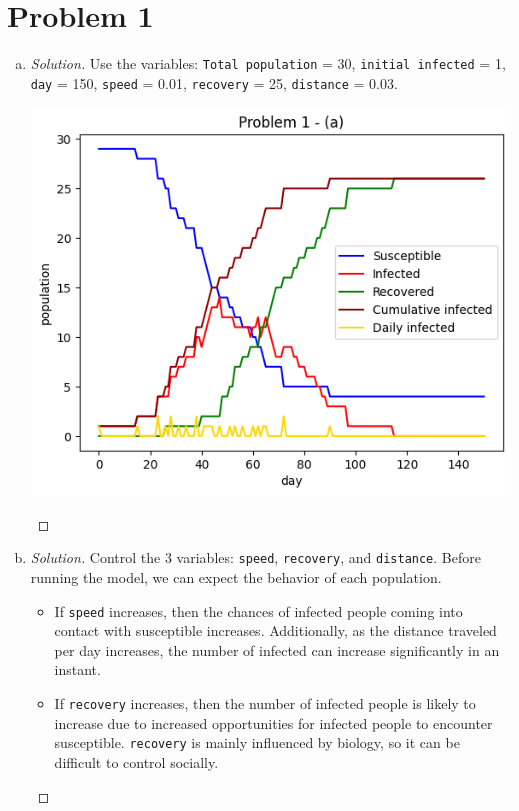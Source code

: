 \section*{Problem 1}
	\begin{enumerate} [a)]
		\item 
		\begin{proof} [Solution]
			Use the variables: \texttt{Total population} = 30, \texttt{initial infected} = 1, \texttt{day} = 150, \texttt{speed} = 0.01, \texttt{recovery} = 25, \texttt{distance} = 0.03.
			\begin{center}
				\includegraphics[scale=0.7]{Problem1_a.png}
			\end{center}
		\end{proof}
		\item 
		\begin{proof} [Solution]
			Control the 3 variables: \texttt{speed}, \texttt{recovery}, and \texttt{distance}. Before running the model, we can expect the behavior of each population.
			\begin{itemize}
				\item If \texttt{speed} increases, then the chances of infected people coming into contact with susceptible increases. Additionally, as the distance traveled per day increases, the number of infected can increase significantly in an instant.
				\item If \texttt{recovery} increases, then the number of infected people is likely to increase due to increased opportunities for infected people to encounter susceptible. \texttt{recovery} is mainly influenced by biology, so it can be difficult to control socially.

\end{itemize}
\end{proof}
\end{enumerate}
